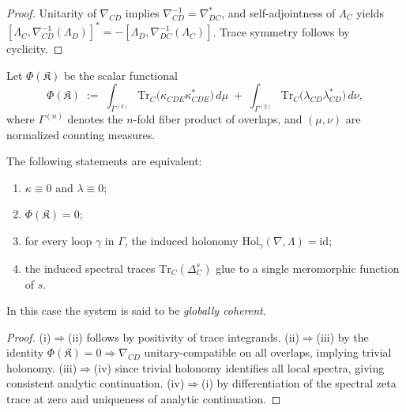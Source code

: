 \begin{proof}
Unitarity of $\nabla_{CD}$ implies $\nabla_{CD}^{-1}=\nabla_{DC}^*$, and self-adjointness of $\Lambda_C$ yields $[\Lambda_C,\nabla_{CD}^{-1}(\Lambda_D)]^*=-[\Lambda_D,\nabla_{DC}^{-1}(\Lambda_C)]$. 
Trace symmetry follows by cyclicity. \relax
\end{proof}


\begin{definition}\label{def:coherence-functional}
Let $\Phi(\mathfrak K)$ be the scalar functional
\[
\Phi(\mathfrak K)\;:=\;\int_{\Gamma^{(3)}}\!\mathrm{Tr}_C\!\big(\kappa_{CDE}\kappa_{CDE}^*\big)\,d\mu
\;+\;
\int_{\Gamma^{(2)}}\!\mathrm{Tr}_C\!\big(\lambda_{CD}\lambda_{CD}^*\big)\,d\nu,
\]
where $\Gamma^{(n)}$ denotes the $n$-fold fiber product of overlaps, and $(\mu,\nu)$ are normalized counting measures.
\end{definition}

\begin{theorem}\label{thm:coherence-equivalence}
The following statements are equivalent:
\begin{enumerate}
  \item[(i)] $\kappa\equiv0$ and $\lambda\equiv0$;
  \item[(ii)] $\Phi(\mathfrak K)=0$;
  \item[(iii)] for every loop $\gamma$ in $\Gamma$, the induced holonomy $\mathrm{Hol}_\gamma(\nabla,\Lambda)=\mathrm{id}$;
  \item[(iv)] the induced spectral traces $\mathrm{Tr}_C(\Delta_C^s)$ glue to a single meromorphic function of $s$.
\end{enumerate}
In this case the system is said to be \emph{globally coherent}.
\end{theorem}

\begin{proof}
(i)$\Rightarrow$(ii) follows by positivity of trace integrands.  
(ii)$\Rightarrow$(iii) by the identity $\Phi(\mathfrak K)=0\Rightarrow\nabla_{CD}$ unitary-compatible on all overlaps, implying trivial holonomy.  
(iii)$\Rightarrow$(iv) since trivial holonomy identifies all local spectra, giving consistent analytic continuation.  
(iv)$\Rightarrow$(i) by differentiation of the spectral zeta trace at zero and uniqueness of analytic continuation. \relax
\end{proof}

